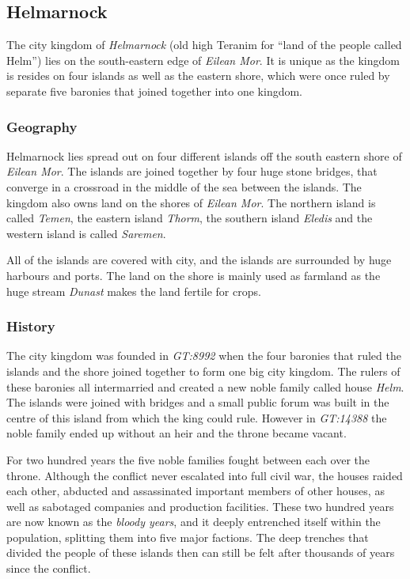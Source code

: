 \subsection{Helmarnock}

The city kingdom of \emph{Helmarnock} (old high Teranim for ``land of the
people called Helm'') lies on the south-eastern edge of \emph{Eilean Mor}. It
is unique as the kingdom is resides on four islands as well as the eastern
shore, which were once ruled by separate five baronies that joined together
into one kingdom.

\subsubsection*{Geography}

Helmarnock lies spread out on four different islands off the south eastern
shore of \emph{Eilean Mor}. The islands are joined together by four huge
stone bridges, that converge in a crossroad in the middle of the sea between
the islands. The kingdom also owns land on the shores of \emph{Eilean Mor}.
The northern island is called \emph{Temen}, the eastern island \emph{Thorm},
the southern island \emph{Eledis} and the western island is called
\emph{Saremen}.

All of the islands are covered with city, and the islands are surrounded by
huge harbours and ports. The land on the shore is mainly used as farmland as
the huge stream \emph{Dunast} makes the land fertile for crops.

\subsubsection*{History}

The city kingdom was founded in \emph{GT:8992} when the four baronies that
ruled the islands and the shore joined together to form one big city kingdom.
The rulers of these baronies all intermarried and created a new noble family
called house \emph{Helm}. The islands were joined with bridges and a small
public forum was built in the centre of this island from which the king could
rule. However in \emph{GT:14388} the noble family ended up without an heir and
the throne became vacant.

For two hundred years the five noble families fought between each over the
throne. Although the conflict never escalated into full civil war, the houses
raided each other, abducted and assassinated important members of other
houses, as well as sabotaged companies and production facilities. These two
hundred years are now known as the \emph{bloody years}, and it deeply
entrenched itself within the population, splitting them into five major
factions. The deep trenches that divided the people of these islands then can
still be felt after thousands of years since the conflict.

